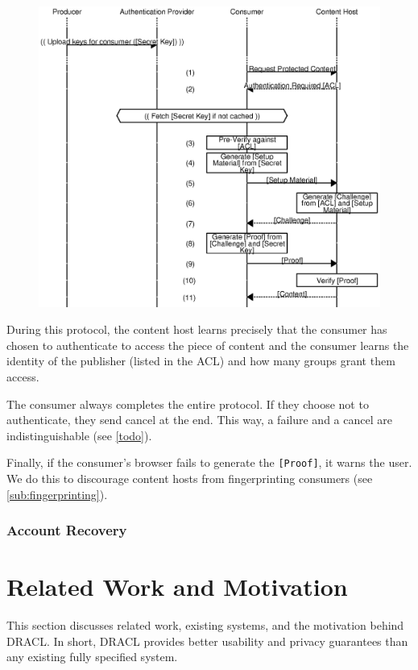 \documentclass[pdftex,12pt,a4papaer]{report}
\begin{document}
\begin{figure}[H]
    \includegraphics{auth.eps}
\end{figure}

During this protocol, the content host learns precisely that the consumer has
chosen to authenticate to access the piece of content and the consumer learns
the identity of the publisher (listed in the ACL) and how many groups grant them
access.

The consumer always completes the entire protocol. If they choose not to
authenticate, they send cancel at the end. This way, a failure and a cancel are
indistinguishable (see \ref{todo}).

Finally, if the consumer's browser fails to generate the \verb=[Proof]=, it
warns the user. We do this to discourage content hosts from fingerprinting
consumers (see \ref{sub:fingerprinting}).

\subsection{Account Recovery}

\chapter{Related Work and Motivation}

This section discusses related work, existing systems, and the motivation behind
DRACL\@. In short, DRACL provides better usability and privacy guarantees than
any existing fully specified system.
\end{document}

